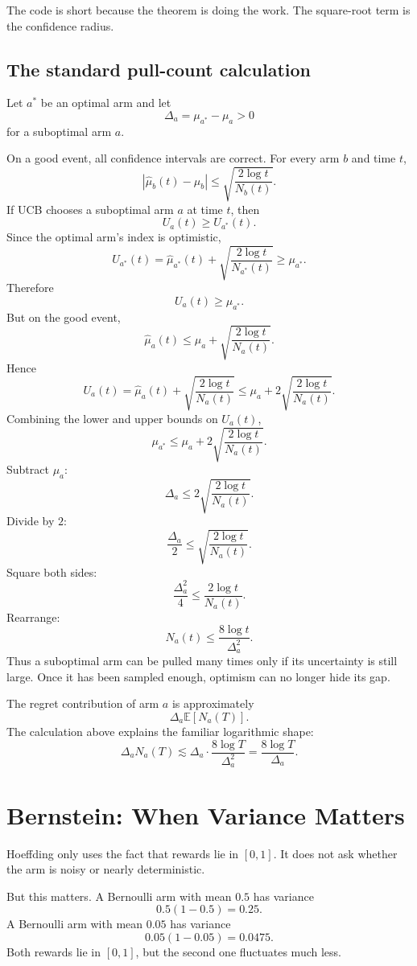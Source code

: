 \documentclass[en,nofont,11pt]{elegantbook}
\newcommand{\E}{\mathbb{E}}
\begin{document}
The code is short because the theorem is doing the work. The square-root term is the confidence radius.

\section{The standard pull-count calculation}

Let $a^*$ be an optimal arm and let
\[
\Delta_a=\mu_{a^*}-\mu_a>0
\]
for a suboptimal arm $a$.

On a good event, all confidence intervals are correct. For every arm $b$ and time $t$,
\[
|\widehat\mu_b(t)-\mu_b|
\le
\sqrt{\frac{2\log t}{N_b(t)}}.
\]
If UCB chooses a suboptimal arm $a$ at time $t$, then
\[
U_a(t)\ge U_{a^*}(t).
\]
Since the optimal arm's index is optimistic,
\[
U_{a^*}(t)
=\widehat\mu_{a^*}(t)+\sqrt{\frac{2\log t}{N_{a^*}(t)}}
\ge \mu_{a^*}.
\]
Therefore
\[
U_a(t)\ge \mu_{a^*}.
\]
But on the good event,
\[
\widehat\mu_a(t)\le \mu_a+\sqrt{\frac{2\log t}{N_a(t)}}.
\]
Hence
\[
U_a(t)
=\widehat\mu_a(t)+\sqrt{\frac{2\log t}{N_a(t)}}
\le
\mu_a+2\sqrt{\frac{2\log t}{N_a(t)}}.
\]
Combining the lower and upper bounds on $U_a(t)$,
\[
\mu_{a^*}
\le
\mu_a+2\sqrt{\frac{2\log t}{N_a(t)}}.
\]
Subtract $\mu_a$:
\[
\Delta_a
\le
2\sqrt{\frac{2\log t}{N_a(t)}}.
\]
Divide by $2$:
\[
\frac{\Delta_a}{2}
\le
\sqrt{\frac{2\log t}{N_a(t)}}.
\]
Square both sides:
\[
\frac{\Delta_a^2}{4}
\le
\frac{2\log t}{N_a(t)}.
\]
Rearrange:
\[
N_a(t)
\le
\frac{8\log t}{\Delta_a^2}.
\]
Thus a suboptimal arm can be pulled many times only if its uncertainty is still large. Once it has been sampled enough, optimism can no longer hide its gap.

The regret contribution of arm $a$ is approximately
\[
\Delta_a \E[N_a(T)].
\]
The calculation above explains the familiar logarithmic shape:
\[
\Delta_a N_a(T)
\lesssim
\Delta_a\cdot \frac{8\log T}{\Delta_a^2}
=
\frac{8\log T}{\Delta_a}.
\]

\chapter{Bernstein: When Variance Matters}

Hoeffding only uses the fact that rewards lie in $[0,1]$. It does not ask whether the arm is noisy or nearly deterministic.

But this matters. A Bernoulli arm with mean $0.5$ has variance
\[
0.5(1-0.5)=0.25.
\]
A Bernoulli arm with mean $0.05$ has variance
\[
0.05(1-0.05)=0.0475.
\]
Both rewards lie in $[0,1]$, but the second one fluctuates much less.
\end{document}
